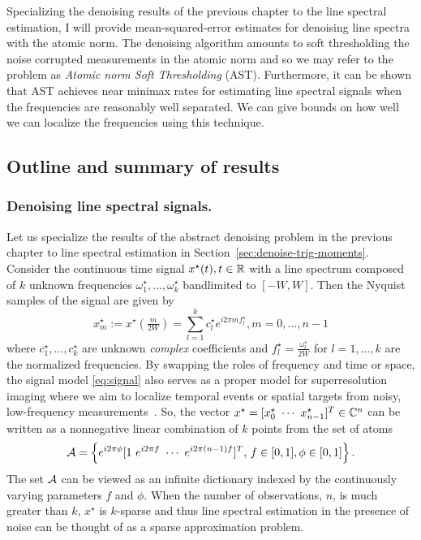 Specializing the denoising results of the previous chapter to the line spectral
estimation, I will provide mean-squared-error estimates for denoising line
spectra with the atomic norm. The denoising algorithm amounts to soft
thresholding the noise corrupted measurements in the atomic norm and so we may
refer to the problem as \emph{Atomic norm Soft Thresholding} (AST). Furthermore,
it can be shown that AST achieves near minimax rates for estimating line
spectral signals when the frequencies are reasonably well separated. We can
give bounds on how well we can localize the frequencies using this technique.

\subsection{Outline and summary of results} 

\subsubsection{Denoising line spectral signals.} 

Let us specialize the results of the abstract denoising problem in the previous
chapter to line spectral estimation in Section~\ref{sec:denoise-trig-moments}.
Consider the continuous time signal $x^\star(t), t\in \mathbb{R}$ with a line spectrum composed of $k$ unknown frequencies $\omega_1^\star, \ldots, \omega_k^\star$ bandlimited to $[-W,W]$. Then the Nyquist samples of the signal are given by
\begin{equation}
\label{eq:signal}
 x^\star_m := x^\star\left(\tfrac{m}{2W}\right) = \sum_{l=1}^k c_l^\star e^{i 2 \pi m f_l^\star}, m = 0, \ldots, n-1
\end{equation}
where $c_1^\star, \ldots, c_k^\star$ are unknown \emph{complex} coefficients and
$f_l^\star = \tfrac{\omega_l^\star}{2W}$ for $l = 1, \ldots, k$ are the
normalized frequencies. By swapping the roles of frequency and time or space,
the signal model \eqref{eq:signal} also serves as a proper model for
superresolution imaging where we aim to localize temporal events or spatial
targets from noisy, low-frequency measurements~\cite{cg_exact12,cg_noisy}. So,
the vector $x^\star = [x^\star_0 ~ \cdots ~ x^\star_{n-1}]^T \in \mathbb{C}^n$ can be
written as a nonnegative linear combination of $k$ points from the set of atoms
\[
\mathcal{A} = \left\{e^{i 2\pi \phi}[1 ~ e^{i2\pi f} ~ \cdots ~ e^{i2\pi (n-1) f}]^T,\, f \in [0,1], \phi \in [0,1] \right\}.
\] 
The set $\mathcal{A}$ can be viewed as an infinite dictionary indexed by the continuously
varying parameters $f$ and $\phi$. When the number of observations, $n$, is much
greater than $k$, $x^\star$ is $k$-sparse and thus line spectral estimation in
the presence of noise can be thought of as a sparse approximation problem. 

